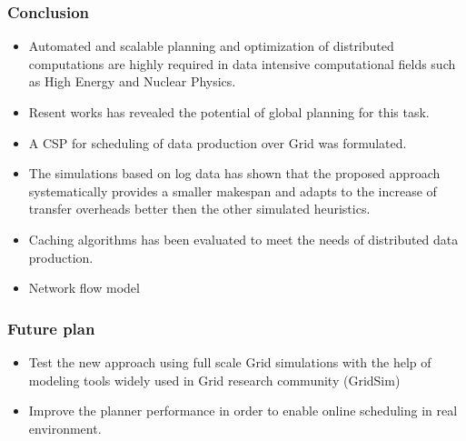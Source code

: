 \documentclass{beamer}
\begin{document}
\begin{frame}\frametitle{Conclusion}
\begin{block}{}
\begin{itemize}
\item Automated and scalable planning and optimization of distributed computations are highly required in data intensive computational fields such as High Energy and Nuclear Physics.
\item Resent works has revealed the potential of global planning for this task.
\item A CSP for scheduling of data production over Grid was formulated. 
\item The simulations based on log data has shown that the proposed approach systematically provides a smaller makespan and adapts to the increase of transfer overheads better then the other simulated  heuristics.
\item Caching algorithms has been evaluated to meet the needs of distributed data production.
\item Network flow model
\end{itemize}
\end{block}
\end{frame}

\begin{frame}\frametitle{Future plan}
\begin{block}{}
\begin{itemize}
\item Test the new approach using full scale Grid simulations with the help of modeling tools widely used in Grid research community (GridSim) 
\item Improve the planner performance in order to enable online scheduling in real environment. 
\end{itemize}
\end{block}
\end{frame}

\printbibliography
\end{document}
